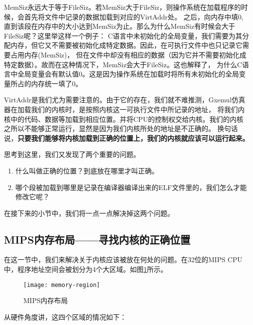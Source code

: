 \begin{note}
MemSiz永远大于等于FileSiz。若MemSiz大于FileSiz，则操作系统在加载程序的时候，会首先将文件中记录的数据加载到对应的VirtAddr处。
之后，向内存中填0,直到该段在内存中的大小达到MemSiz为止。那么为什么MemSiz有时候会大于FileSiz呢？这里举这样一个例子：
C语言中未初始化的全局变量，我们需要为其分配内存，但它又不需要被初始化成特定数据。因此，在可执行文件中也只记录它需要占用内存(MemSiz)，
但在文件中却没有相应的数据（因为它并不需要初始化成特定数据）。故而在这种情况下，MemSiz会大于FileSiz。这也解释了，
为什么C语言中全局变量会有默认值0。这是因为操作系统在加载时将所有未初始化的全局变量所占的内存统一填了0。
\end{note}

VirtAddr是我们尤为需要注意的。由于它的存在，我们就不难推测，Gxemul仿真器在加载我们的内核时，是按照内核这一可执行文件中所记录的地址，
将我们内核中的代码、数据等加载到相应位置。并将CPU的控制权交给内核。我们的内核之所以不能够正常运行，显然是因为我们内核所处的地址是不正确的。
换句话说，\textbf{只要我们能够将内核加载到正确的位置上，我们的内核就应该可以运行起来。}

思考到这里，我们又发现了两个重要的问题。
\begin{enumerate}
  \item 什么叫做正确的位置？到底放在哪里才叫正确。
  \item 哪个段被加载到哪里是记录在编译器编译出来的ELF文件里的，我们怎么才能修改它呢？
\end{enumerate}
在接下来的小节中，我们将一点一点解决掉这两个问题。

\subsection{MIPS内存布局——寻找内核的正确位置}
在这一节中，我们来解决关于内核应该被放在何处的问题。在32位的MIPS CPU中，程序地址空间会被划分为4个大区域。如图\ref{fig:memory-region}所示。

\begin{figure}[htbp]
  \centering
  \texttt{[image: memory-region]}
  \caption{MIPS内存布局}\label{fig:memory-region} 
\end{figure}

从硬件角度讲，这四个区域的情况如下：

